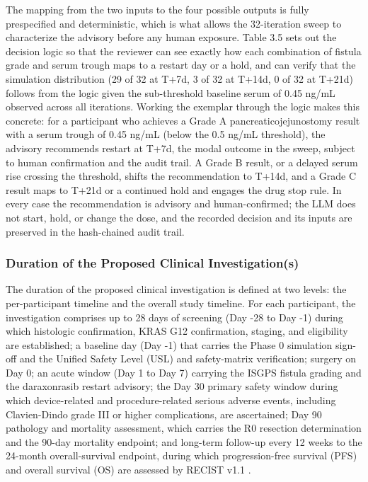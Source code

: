 The mapping from the two inputs to the four possible outputs is fully prespecified
and deterministic, which is what allows the 32-iteration sweep to characterize the
advisory before any human exposure. Table 3.5 sets out the decision logic so that the
reviewer can see exactly how each combination of fistula grade and serum trough maps
to a restart day or a hold, and can verify that the simulation distribution (29 of 32
at T+7d, 3 of 32 at T+14d, 0 of 32 at T+21d) follows from the logic given the
sub-threshold baseline serum of 0.45 ng/mL observed across all iterations. Working
the exemplar through the logic makes this concrete: for a participant who achieves a
Grade A pancreaticojejunostomy result with a serum trough of 0.45 ng/mL (below the
0.5 ng/mL threshold), the advisory recommends restart at T+7d, the modal outcome in
the sweep, subject to human confirmation and the audit trail. A Grade B result, or a
delayed serum rise crossing the threshold, shifts the recommendation to T+14d, and a
Grade C result maps to T+21d or a continued hold and engages the drug stop rule. In
every case the recommendation is advisory and human-confirmed; the LLM does not
start, hold, or change the dose, and the recorded decision and its inputs are
preserved in the hash-chained audit trail.



\subsubsection{Duration of the Proposed Clinical Investigation(s)}

The duration of the proposed clinical investigation is defined at two levels: the
per-participant timeline and the overall study timeline. For each participant, the
investigation comprises up to 28 days of screening (Day -28 to Day -1) during which
histologic confirmation, KRAS G12 confirmation, staging, and eligibility are
established; a baseline day (Day -1) that carries the Phase 0 simulation sign-off
and the Unified Safety Level (USL) and safety-matrix verification; surgery on Day 0;
an acute window (Day 1 to Day 7) carrying the ISGPS fistula grading and the
daraxonrasib restart advisory; the Day 30 primary safety window during which
device-related and procedure-related serious adverse events, including Clavien-Dindo
grade III or higher complications, are ascertained; Day 90 pathology and mortality
assessment, which carries the R0 resection determination and the 90-day mortality
endpoint; and long-term follow-up every 12 weeks to the 24-month overall-survival
endpoint, during which progression-free survival (PFS) and overall survival (OS)
are assessed by RECIST v1.1 \cite{daraxwhipple}.

